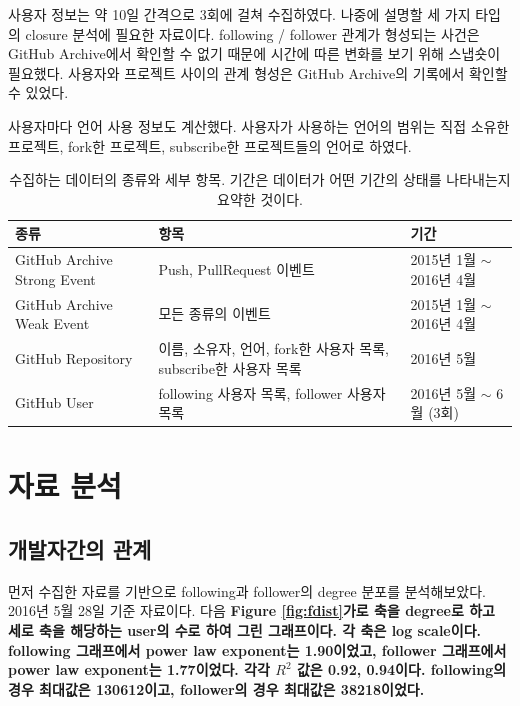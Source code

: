 \documentclass[10pt, a4paper, titlepage]{article}
\begin{document}
	사용자 정보는 약 10일 간격으로 3회에 걸쳐 수집하였다. 나중에 설명할 세 가지 타입의 closure 분석에 필요한 자료이다. following / follower 관계가 형성되는 사건은 GitHub Archive에서 확인할 수 없기 때문에 시간에 따른 변화를 보기 위해 스냅숏이 필요했다.	사용자와 프로젝트 사이의 관계 형성은 GitHub Archive의 기록에서 확인할 수 있었다.

	사용자마다 언어 사용 정보도 계산했다. 사용자가 사용하는 언어의 범위는 직접 소유한 프로젝트, fork한 프로젝트, subscribe한 프로젝트들의 언어로 하였다.

\begin{table}[ht]
\begin{tabular}{|m{2.5cm}|m{4cm}|m{4.0cm}|}

\hline

종류 & 항목 & 기간 \\

\hline

GitHub Archive Strong Event &
Push, PullRequest 이벤트 &
2015년 1월 $\sim$ 2016년 4월 \\

\hline

GitHub Archive Weak Event &
모든 종류의 이벤트&
2015년 1월 $\sim$ 2016년 4월 \\

\hline

GitHub Repository &
이름, 소유자, 언어, fork한 사용자 목록, subscribe한 사용자 목록 &
2016년 5월 \\

\hline

GitHub User &
following 사용자 목록,
follower 사용자 목록 &
2016년 5월 $\sim$ 6월 (3회)\\

\hline
\end{tabular} 

\caption{
	수집하는 데이터의 종류와 세부 항목. 기간은 데이터가 어떤 기간의 상태를 나타내는지 요약한 것이다.
}
\label{tab:collect}
\end{table}


\section{자료 분석}
\subsection{개발자간의 관계}
먼저 수집한 자료를 기반으로 following과 follower의 degree 분포를 분석해보았다. 2016년 5월 28일 기준 자료이다. 다음 \bf{Figure} \ref{fig:fdist} 가로 축을 degree로 하고 세로 축을 해당하는 user의 수로 하여 그린 그래프이다. 각 축은 log scale이다. following 그래프에서 power law exponent는 1.90이었고, follower 그래프에서 power law exponent는 1.77이었다. 각각 $R^2$ 값은 0.92, 0.94이다. following의 경우 최대값은 130612이고, follower의 경우 최대값은 38218이었다.
\end{document}
